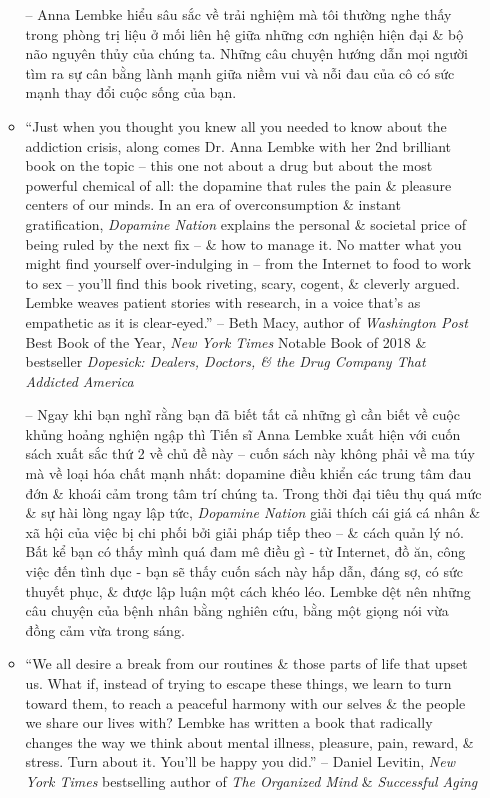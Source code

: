 \documentclass{article}
\begin{document}
\begin{enumerate}
\begin{itemize}
		-- {\sc Anna Lembke} hiểu sâu sắc về trải nghiệm mà tôi thường nghe thấy trong phòng trị liệu ở mối liên hệ giữa những cơn nghiện hiện đại \& bộ não nguyên thủy của chúng ta. Những câu chuyện hướng dẫn mọi người tìm ra sự cân bằng lành mạnh giữa niềm vui và nỗi đau của cô có sức mạnh thay đổi cuộc sống của bạn.
		\item ``Just when you thought you knew all you needed to know about the addiction crisis, along comes Dr. {\sc Anna Lembke} with her 2nd brilliant book on the topic -- this one not about a drug but about the most powerful chemical of all: the dopamine that rules the pain \& pleasure centers of our minds. In an era of overconsumption \& instant gratification, {\it Dopamine Nation} explains the personal \& societal price of being ruled by the next fix -- \& how to manage it. No matter what you might find yourself over-indulging in -- from the Internet to food to work to sex -- you'll find this book riveting, scary, cogent, \& cleverly argued. Lembke weaves patient stories with research, in a voice that's as empathetic as it is clear-eyed.'' -- {\sc Beth Macy}, author of {\it Washington Post} Best Book of the Year, {\it New York Times} Notable Book of 2018 \& bestseller {\it Dopesick: Dealers, Doctors, \& the Drug Company That Addicted America}
		
		-- Ngay khi bạn nghĩ rằng bạn đã biết tất cả những gì cần biết về cuộc khủng hoảng nghiện ngập thì Tiến sĩ {\sc Anna Lembke} xuất hiện với cuốn sách xuất sắc thứ 2 về chủ đề này -- cuốn sách này không phải về ma túy mà về loại hóa chất mạnh nhất: dopamine điều khiển các trung tâm đau đớn \& khoái cảm trong tâm trí chúng ta. Trong thời đại tiêu thụ quá mức \& sự hài lòng ngay lập tức, {\it Dopamine Nation} giải thích cái giá cá nhân \& xã hội của việc bị chi phối bởi giải pháp tiếp theo -- \& cách quản lý nó. Bất kể bạn có thấy mình quá đam mê điều gì - từ Internet, đồ ăn, công việc đến tình dục - bạn sẽ thấy cuốn sách này hấp dẫn, đáng sợ, có sức thuyết phục, \& được lập luận một cách khéo léo. Lembke dệt nên những câu chuyện của bệnh nhân bằng nghiên cứu, bằng một giọng nói vừa đồng cảm vừa trong sáng.
		\item ``We all desire a break from our routines \& those parts of life that upset us. What if, instead of trying to escape these things, we learn to turn toward them, to reach a peaceful harmony with our selves \& the people we share our lives with? Lembke has written a book that radically changes the way we think about mental illness, pleasure, pain, reward, \& stress. Turn about it. You'll be happy you did.'' -- {\sc Daniel Levitin}, {\it New York Times} bestselling author of {\it The Organized Mind} \& {\it Successful Aging}
		

\end{itemize}
\end{enumerate}
\end{document}
